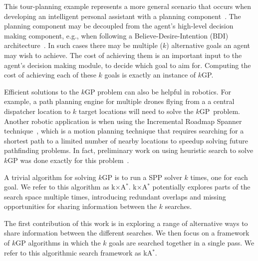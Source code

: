 \documentclass[twoside,11pt]{article}
\newcommand{\kgs}{$k$GP\xspace}
\newcommand{\kastar}{kA$^*$\xspace}
\newcommand{\kxastar}{k$\times$A$^*$\xspace}
\newcommand{\roni}[1]{\textbf{[RS:#1]}}
\begin{document}
This tour-planning example represents a more general scenario that occurs when developing an intelligent personal assistant with a planning component~\cite{myers2007intelligent,chalupsky2001electric}.
The planning component may be decoupled from the agent's high-level decision making component, e.g., when following a Believe-Desire-Intention (BDI) architecture~\cite{bratman1999intention,georgeff1998belief}.
In such cases there may be multiple ($k$) alternative goals an agent may wish to achieve.
The cost of achieving them is an important input to the agent's decision making module, to decide which goal to aim for.
Computing the cost of achieving each of these $k$ goals is exactly an instance of \kgs{}. %


Efficient solutions to the \kgs problem can also be helpful in robotics.
For example, a path planning engine for multiple drones flying from a a central dispatcher location to $k$ target locations will need to solve the \kgs\ problem.
Another robotic application is when using the Incremental Roadmap Spanner technique~\cite{marble2013asymptotically}, which is a motion planning technique that requires searching for a shortest path to a limited number of nearby locations to speedup solving future pathfinding problems.
In fact, preliminary work on using heuristic search to solve \kgs was done exactly for this problem~\cite{DobsonB14}.


A trivial algorithm for solving \kgs is to run a SPP solver $k$ times, one for each goal.
We refer to this algorithm as \kxastar.
\kxastar potentially explores parts of the search space multiple times, introducing redundant overlaps and missing opportunities for sharing information between the $k$ searches. 

The first contribution of this work is in exploring a range of alternative ways to share information between the different searches. We then focus on a framework of \kgs{} algorithms in which the $k$ goals are searched together in a single pass. 
We refer to this algorithmic search framework as \kastar. 
\end{document}
